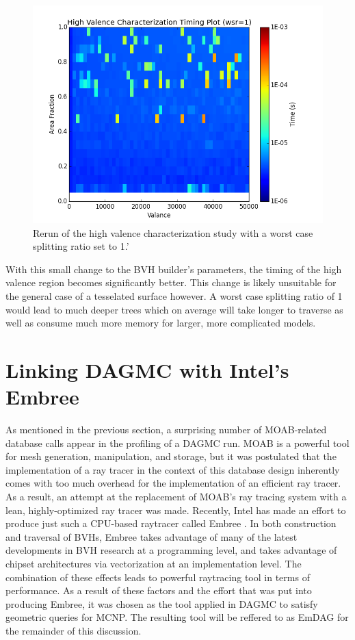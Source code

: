 \documentclass[10pt, a4paper]{article}
\begin{document}
  
\begin{figure}[H]
  \centering
    \includegraphics[scale=0.35]{hv_study_MOAB_wsr1.png}
    \caption{Rerun of the high valence characterization study with a worst case splitting ratio set to 1.'}
\end{figure}


With this small change to the BVH builder's parameters, the timing of the high valence region becomes significantly better. This change is likely unsuitable for the general case of a tesselated surface however. A worst case splitting ratio of 1 would lead to much deeper trees which on average will take longer to traverse as well as consume much more memory for larger, more complicated models.

\section{Linking DAGMC with Intel's Embree}%

As mentioned in the previous section, a surprising number of MOAB-related database calls appear in the profiling of a DAGMC run. MOAB is a powerful tool for mesh generation, manipulation, and storage, but it was postulated that the implementation of a ray tracer in the context of this database design inherently comes with too much overhead for the implementation of an efficient ray tracer. As a result, an attempt at the replacement of MOAB's ray tracing system with a lean, highly-optimized ray tracer was made. Recently, Intel has made an effort to produce just such a CPU-based raytracer called Embree \cite{embree}. In both construction and traversal of BVHs, Embree takes advantage of many of the latest developments in BVH research at a programming level, and takes advantage of chipset architectures via vectorization at an implementation level. The combination of these effects leads to powerful raytracing tool in terms of performance. As a result of these factors and the effort that was put into producing Embree, it was chosen as the tool applied in DAGMC to satisfy geometric queries for MCNP. The resulting tool will be reffered to as EmDAG for the remainder of this discussion.
\end{document}
